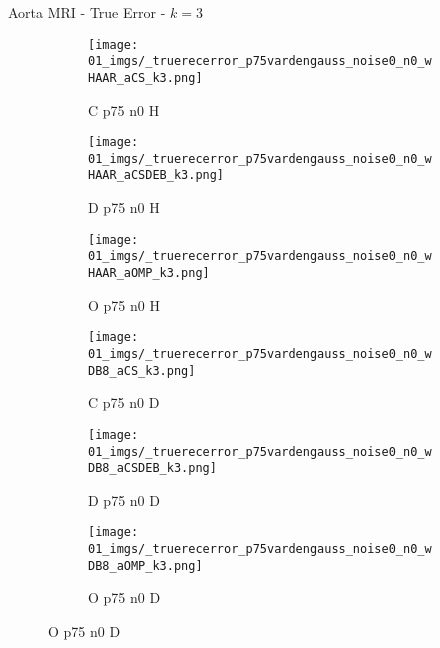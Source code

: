 \begin{frame}{Aorta MRI - True Error - $k=3$}{}
\begin{figure}
\begin{subfigure}{0.13\textwidth}
\texttt{[image: 01\_imgs/\_truerecerror\_p75vardengauss\_noise0\_n0\_wHAAR\_aCS\_k3.png]}
\caption*{\tiny C p75 n0 H}
\end{subfigure}
\begin{subfigure}{0.13\textwidth}
\texttt{[image: 01\_imgs/\_truerecerror\_p75vardengauss\_noise0\_n0\_wHAAR\_aCSDEB\_k3.png]}
\caption*{\tiny D p75 n0 H}
\end{subfigure}
\begin{subfigure}{0.13\textwidth}
\texttt{[image: 01\_imgs/\_truerecerror\_p75vardengauss\_noise0\_n0\_wHAAR\_aOMP\_k3.png]}
\caption*{\tiny O p75 n0 H}
\end{subfigure}
\begin{subfigure}{0.13\textwidth}
\texttt{[image: 01\_imgs/\_truerecerror\_p75vardengauss\_noise0\_n0\_wDB8\_aCS\_k3.png]}
\caption*{\tiny C p75 n0 D}
\end{subfigure}
\begin{subfigure}{0.13\textwidth}
\texttt{[image: 01\_imgs/\_truerecerror\_p75vardengauss\_noise0\_n0\_wDB8\_aCSDEB\_k3.png]}
\caption*{\tiny D p75 n0 D}
\end{subfigure}
\begin{subfigure}{0.13\textwidth}
\texttt{[image: 01\_imgs/\_truerecerror\_p75vardengauss\_noise0\_n0\_wDB8\_aOMP\_k3.png]}
\caption*{\tiny O p75 n0 D}
\end{subfigure}
\end{figure}
\end{frame}


